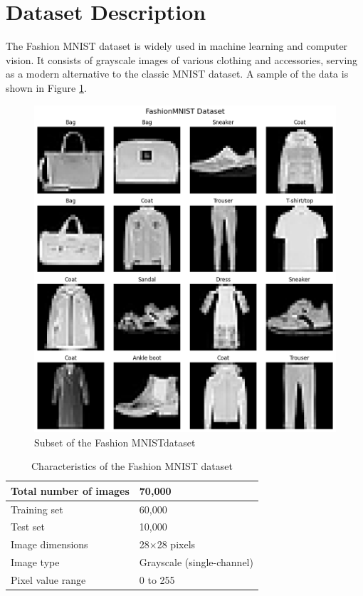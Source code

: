 \documentclass[12pt]{article}
\newcommand{\fm}{Fashion MNIST}
\begin{document}
	\section{Dataset Description}
	The Fashion MNIST dataset is widely used in machine learning and computer vision. It consists of grayscale images of various clothing and accessories, serving as a modern alternative to the classic MNIST dataset. A sample of the data is shown in Figure \ref{fig: fmn data}.
	\begin{figure}[H]
		\centering
		\includegraphics[scale=0.45]{figs/fmn data raw}
		\caption{Subset of the \fm dataset}
		\label{fig: fmn data}
	\end{figure}
	\begin{table}[H]
		\centering
		\begin{tabularx}{\linewidth}{|X|X|}
			\toprule
			Total number of images & 70,000 \\
			\midrule
			Training set & 60,000 \\
			\midrule
			Test set & 10,000 \\
			\midrule
			Image dimensions & 28×28 pixels \\
			\midrule
			Image type & Grayscale (single-channel) \\
			\midrule
			Pixel value range & 0 to 255 \\
			\bottomrule
		\end{tabularx}
		\caption{Characteristics of the Fashion MNIST dataset}
		\label{tbl: fMNIST Chars}
	\end{table}
\end{document}
